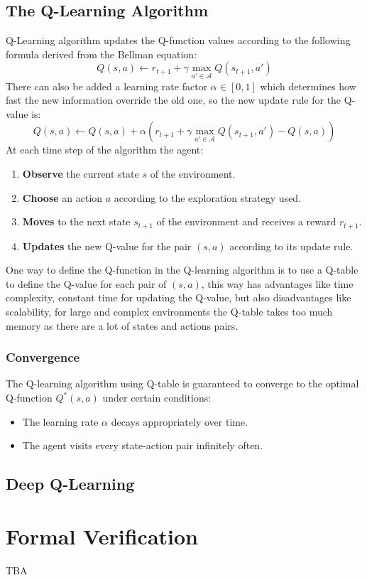 \documentclass[12pt,a4paper]{report}
\begin{document}
\subsection{The Q-Learning Algorithm}
Q-Learning algorithm updates the Q-function values according to the following formula derived from the Bellman equation: $$Q(s,a)\leftarrow r_{t+1}+\gamma\max_{a'\in \mathcal{A}}Q(s_{t+1},a')$$ There can also be added a learning rate factor $\alpha\in[0,1]$ which determines how fast the new information override the old one, so the new update rule for the Q-value is: $$Q(s,a)\leftarrow Q(s,a)+\alpha(r_{t+1}+\gamma\max_{a'\in \mathcal{A}}Q(s_{t+1},a')-Q(s,a))$$ At each time step of the algorithm the agent:
\begin{enumerate}
    \item \textbf{Observe} the current state $s$ of the environment.
    \item \textbf{Choose} an action $a$ according to the exploration strategy used.
    \item \textbf{Moves} to the next state $s_{t+1}$ of the environment and receives a reward $r_{t+1}$.
    \item \textbf{Updates} the new Q-value for the pair $(s,a)$ according to its update rule.
\end{enumerate}
One way to define the Q-function in the Q-learning algorithm is to use a Q-table to define the Q-value for each pair of $(s,a)$, this way has advantages like time complexity, constant time for updating the Q-value, but also disadvantages like scalability, for large and complex environments the Q-table takes too much memory as there are a lot of states and actions pairs.
\subsubsection{Convergence}
The Q-learning algorithm using Q-table is guaranteed to converge to the optimal Q-function $Q^*(s,a)$ under certain conditions:
\begin{itemize}
    \item The learning rate $\alpha$ decays appropriately over time.
    \item The agent visits every state-action pair infinitely often.
\end{itemize}
\subsection{Deep Q-Learning}
\section{Formal Verification}
TBA
\end{document}
